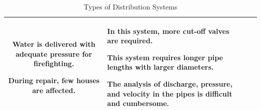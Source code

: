 \documentclass{article}
\begin{document}
\begin{table}[H]
\begin{tabular}{ | c m{4cm} | m{3.1cm} |  m{3.1cm} |}
\begin{itemize}[leftmargin=*]
{        \item Water is delivered with adequate pressure for firefighting.
        \item During repair, few houses are affected.}
      \end{itemize}
      \vspace{-1em} 
    & 
       \begin{itemize}[leftmargin=*]
      \scriptsize{
        \item In this system, more cut-off valves are required.
        \item This system requires longer pipe lengths with larger diameters.
        \item The analysis of discharge, pressure, and velocity in the pipes is difficult and cumbersome.}
      \end{itemize}
    \\ \hline
   \end{tabular}
   \caption{Types of Distribution Systems}
   \label{table:TypesofDistributionSystems}
\end{table}

\thispagestyle{empty}
\end{document}
